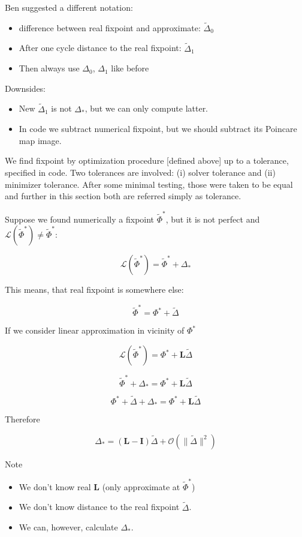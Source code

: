 \documentclass[a4paper,12pt]{article}
\newcommand{\wt}{\widetilde} %
\newcommand{\FP}{\Phi^*}%
\newcommand{\D}{\Delta}%
\begin{document}
\begin{itshape}
{\small 
Ben suggested a different notation:
\begin{itemize}
\item  difference between real fixpoint and approximate: $\wt \D_0$
\item  After one cycle distance to the real fixpoint: $\wt \D_1$
\item Then always use $\D_0$, $\D_1$ like before

\end{itemize}
Downsides:

\begin{itemize}
\item New $\wt \D_1$ is not $\D_*$, but we can only compute latter.
\item In code we subtract numerical fixpoint, but we should  subtract its Poincare map image.
\end{itemize}

}
\end{itshape}

We find fixpoint by optimization procedure [defined above] up to a tolerance, specified in code. Two tolerances are involved: (i) solver tolerance and (ii) minimizer tolerance. After some minimal testing, those were taken to be equal and further in this section both are referred simply as tolerance.

Suppose we found numerically a fixpoint $\wt \Phi^*$, but it is not perfect and $ \mathcal{L}(\wt \FP) \neq \wt \FP $:

$$ \mathcal{L}(\wt \FP) = \wt \FP + \D_*$$

This means, that real fixpoint is somewhere else:

$$\wt \FP= \FP + \wt{\D}$$

If we consider linear approximation in vicinity of $\FP$


$$ \mathcal{L}(\wt \FP) = \FP + \mathbf{L}  \wt{\D}$$

$$ \wt \FP + \D_* = \FP + \mathbf{L}  \wt{\D}$$

$$  \FP + \wt{\D} + \D_* = \FP + \mathbf{L}  \wt{\D}$$

Therefore

\begin{equation}
\D_* = ( \mathbf{L} - \mathbf{I} ) \wt{\D} + \mathcal{O}(\lVert \wt{\D} \rVert^2)
\label{eqn:delta_star}
\end{equation}



Note
\begin{itemize}

\item We don't know real $\mathbf{L}$ (only approximate at $\wt \FP$)
\item We don't know distance to the real fixpoint $\wt{\D}$.
\item We can, however, calculate $\D_*$.

\end{itemize}
\end{document}
